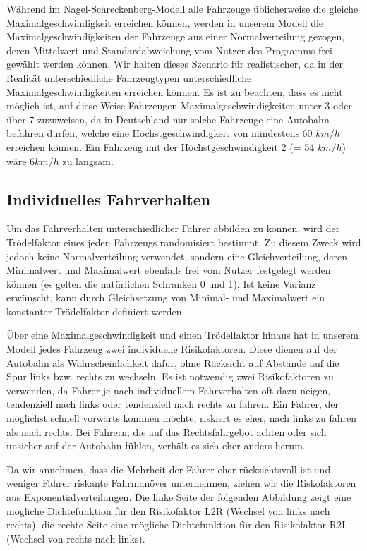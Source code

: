 \documentclass[10pt, a4paper]{article}
\newcommand\nsm{Nagel-Schreckenberg-Modell }
\begin{document}
Während im \nsm alle Fahrzeuge üblicherweise die gleiche Maximalgeschwindigkeit erreichen können, werden in unserem Modell die Maximalgeschwindigkeiten der Fahrzeuge aus einer Normalverteilung gezogen, deren Mittelwert und Standardabweichung vom Nutzer des Programms frei gewählt werden können. Wir halten dieses Szenario für realistischer, da in der Realität unterschiedliche Fahrzeugtypen unterschiedliche Maximalgeschwindigkeiten erreichen können. Es ist zu beachten, dass es nicht möglich ist, auf diese Weise Fahrzeugen Maximalgeschwindigkeiten unter 3 oder über 7 zuzuweisen, da in Deutschland nur solche Fahrzeuge eine Autobahn befahren dürfen, welche eine Höchstgeschwindigkeit von mindestens 60 $km/h$ erreichen können. Ein Fahrzeug mit der Höchstgeschwindigkeit 2 (= 54 $km/h$) wäre $6km/h$ zu langsam.

\subsection{Individuelles Fahrverhalten}

Um das Fahrverhalten unterschiedlicher Fahrer abbilden zu können, wird der Trödelfaktor eines jeden Fahrzeugs randomisiert bestimmt. Zu diesem Zweck wird jedoch keine Normalverteilung verwendet, sondern eine Gleichverteilung, deren Minimalwert und Maximalwert ebenfalls frei vom Nutzer festgelegt werden können (es gelten die natürlichen Schranken 0 und 1). Ist keine Varianz erwünscht, kann durch Gleichsetzung von Minimal- und Maximalwert ein konstanter Trödelfaktor definiert werden.

Über eine Maximalgeschwindigkeit und einen Trödelfaktor hinaus hat in unserem Modell jedes Fahrzeug zwei individuelle Risikofaktoren. Diese dienen auf der Autobahn als Wahrscheinlichkeit dafür, ohne Rücksicht auf Abstände auf die Spur links bzw. rechts zu wechseln. Es ist notwendig zwei Risikofaktoren zu verwenden, da Fahrer je nach individuellem Fahrverhalten oft dazu neigen, tendenziell nach links oder tendenziell nach rechts zu fahren. Ein Fahrer, der möglichst schnell vorwärts kommen möchte, riskiert es eher, nach links zu fahren als nach rechts. Bei Fahrern, die auf das Rechtsfahrgebot achten oder sich unsicher auf der Autobahn fühlen, verhält es sich eher anders herum.

Da wir annehmen, dass die Mehrheit der Fahrer eher rücksichtsvoll ist und weniger Fahrer riskante Fahrmanöver unternehmen, ziehen wir die Riskofaktoren aus Exponentialverteilungen. Die linke Seite der folgenden Abbildung zeigt eine mögliche Dichtefunktion für den Risikofaktor L2R (Wechsel von links nach rechts), die rechte Seite eine mögliche Dichtefunktion für den Risikofaktor R2L (Wechsel von rechts nach links).
\end{document}
